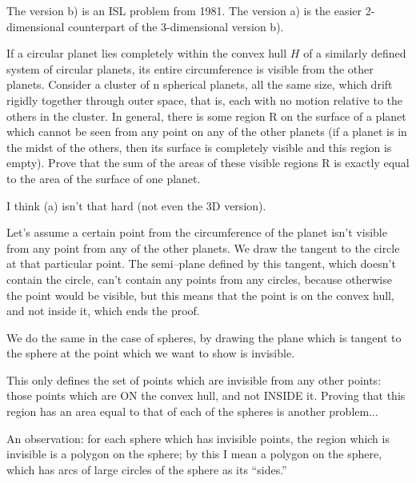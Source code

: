 \begin{question}[name={1981 IMO Shortlist and Beyond}]
	The version b) is an ISL problem from 1981. The version a) is the easier 2-dimensional counterpart of the 3-dimensional version b).
	\begin{tasks}
		\task If a circular planet lies completely within the convex hull $H$ of a similarly defined system of circular planets, its entire circumference is visible from the other planets.
		\task Consider a cluster of n spherical planets, all the same size, which drift rigidly together through outer space, that is, each with no motion relative to the others in the cluster. In general, there is some region R on the surface of a planet which cannot be seen from any point on any of the other planets (if a planet is in the midst of the others, then its surface is completely visible and this region is empty). Prove that the sum of the areas of these visible regions R is exactly equal to the area of the surface of one planet.
	\end{tasks}
\end{question}



\begin{solution}[name={Solution by Grobber}] 
	I think (a) isn't that hard (not even the 3D version).
	
	Let's assume a certain point from the circumference of the planet isn't visible from any point from any of the other planets. We draw the tangent to the circle at that particular point. The semi--plane defined by this tangent, which doesn't contain the circle, can't contain any points from any circles, because otherwise the point would be visible, but this means that the point is on the convex hull, and not inside it, which ends the proof.
	
	We do the same in the case of spheres, by drawing the plane which is tangent to the sphere at the point which we want to show is invisible.
	
	This only defines the set of points which are invisible from any other points: those points which are ON the convex hull, and not INSIDE it. Proving that this region has an area equal to that of each of the spheres is another problem... 
	
	An observation: for each sphere which has invisible points, the region which is invisible is a polygon on the sphere; by this I mean a polygon on the sphere, which has arcs of large circles of the sphere as its ``sides.''
\end{solution}






